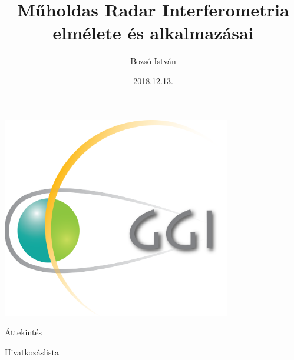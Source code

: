 \documentclass[aspectratio=169]{beamer}
\title[Műholdas Távérzékelés Labor, 2018/19.I.]{Műholdas Radar Interferometria elmélete és alkalmazásai}
\author[Bozsó István]{Bozsó István}
\institute[MTA CSFK GGI]{MTA CSFK Geodéziai és Geofizikai Intézet}
\date{2018.12.13.}
\begin{document}
\begin{frame}
    \titlepage
    \begin{center}
        \begin{minipage}[c]{0.3\textwidth}
            \includegraphics[width=0.75\textwidth]{ggi_logo.png}
        \end{minipage}
    \end{center}
\end{frame}

\begin{frame}{Áttekintés}
    \tableofcontents
\end{frame}








\begin{frame}{Hivatkozáslista}
    
        
\end{frame}
\end{document}
